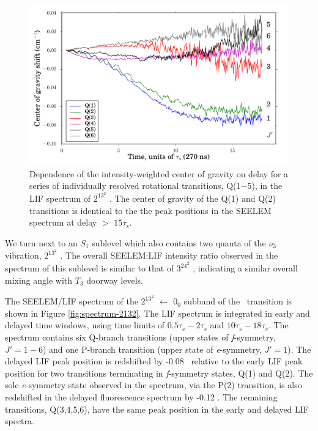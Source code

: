 \documentclass[12pt]{mitthesis}
\begin{document}
\begin{figure}
  \caption{Dependence of the intensity-weighted center of gravity on
    delay for a series of individually resolved rotational
    transitions, Q(1$-$5), in the LIF spectrum of $2^13^2$ .
    The center of gravity of the Q(1) and Q(2) transitions is
    identical to the the peak positions in the SEELEM spectrum at
    delay $>$ $15\tau_s$.}
  \label{fig:2132-q123456-cog-delay}
  \centering
  \vspace{1cm}
  \includegraphics[width=6in]{2132-q123456-cog-delay.pdf}
\end{figure}


We turn next to an $S_1$ sublevel which also contains two quanta of
the $\nu_3$ vibration, $2^13^2$ .  The overall SEELEM:LIF
intensity ratio observed in the spectrum of this sublevel is similar
to that of $3^24^2$ , indicating a similar overall mixing angle
with $T_3$ doorway levels.

The SEELEM/LIF spectrum of the $2^13^2$  $\leftarrow$ $0_0$
subband of the \AtoX\ transition is shown in Figure
\ref{fig:spectrum-2132}.  The LIF spectrum is integrated in early and
delayed time windows, using time limits of $0.5\tau_s-2\tau_s$ and
$10\tau_s-18\tau_s$.  The spectrum contains six Q-branch transitions
(upper states of \emph{f}-symmetry, $J'=1-6$) and one P-branch
transition (upper state of \emph{e}-symmetry, $J'=1$).  The delayed
LIF peak position is redshifted by -0.08 \rcm\ relative to the early
LIF peak position for two transitions terminating in \emph{f}-symmetry
states, Q(1) and Q(2).  The sole \emph{e}-symmetry state observed in
the spectrum, via the P(2) transition, is also redshifted in the
delayed fluorescence spectrum by -0.12 \rcm.  The remaining
transitions, Q(3,4,5,6), have the same peak position in the early and
delayed LIF spectra.
\end{document}

